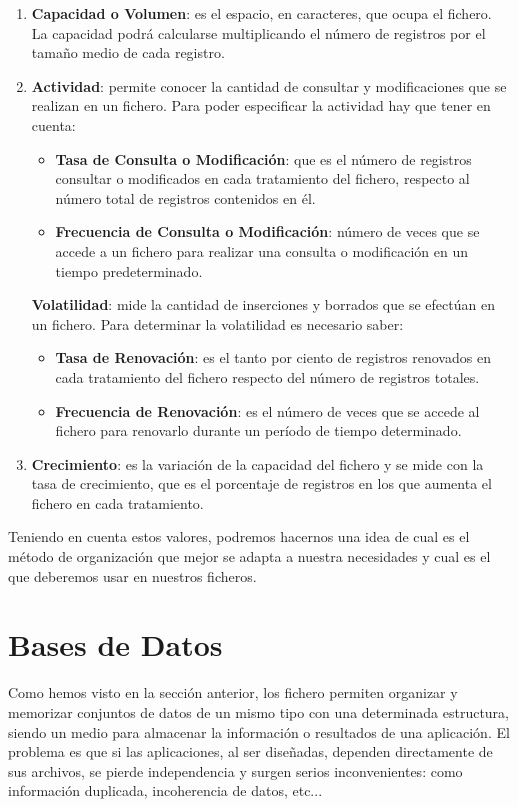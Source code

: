 \begin{enumerate}[label=(\alph*)]
    \item \textbf{Capacidad o Volumen}: es el espacio, en caracteres, que ocupa el fichero. La capacidad podrá calcularse multiplicando el número de registros por el tamaño medio de cada registro.
    \item \textbf{Actividad}: permite conocer la cantidad de consultar y modificaciones que se realizan en un fichero. Para poder especificar la actividad hay que tener en cuenta:
    \begin{itemize}
        \item \textbf{Tasa de Consulta o Modificación}: que es el número de registros consultar o modificados en cada tratamiento del fichero, respecto al número total de registros contenidos en él.
        \item \textbf{Frecuencia de Consulta o Modificación}: número de veces que se accede a un fichero para realizar una consulta o modificación en un tiempo predeterminado.
    \end{itemize}

    \textbf{Volatilidad}: mide la cantidad de inserciones y borrados que se efectúan en un fichero. Para determinar la volatilidad es necesario saber:
    \begin{itemize}
        \item \textbf{Tasa de Renovación}: es el tanto por ciento de registros renovados en cada tratamiento del fichero respecto del número de registros totales.
        \item \textbf{Frecuencia de Renovación}: es el número de veces que se accede al fichero para renovarlo durante un período de tiempo determinado.
    \end{itemize}

    \item \textbf{Crecimiento}: es la variación de la capacidad del fichero y se mide con la tasa de crecimiento, que es el porcentaje de registros en los que aumenta el fichero en cada tratamiento.
\end{enumerate}

Teniendo en cuenta estos valores, podremos hacernos una idea de cual es el método de organización que mejor se adapta a nuestra necesidades y cual es el que deberemos usar en nuestros ficheros.

\newpage

\section{Bases de Datos}
Como hemos visto en la sección anterior, los fichero permiten organizar y memorizar conjuntos de datos de un mismo tipo con una determinada estructura, siendo un medio para almacenar la información o resultados de una aplicación. El problema es que si las aplicaciones, al ser diseñadas, dependen directamente de sus archivos, se pierde independencia y surgen serios inconvenientes: como información duplicada, incoherencia de datos, etc...

